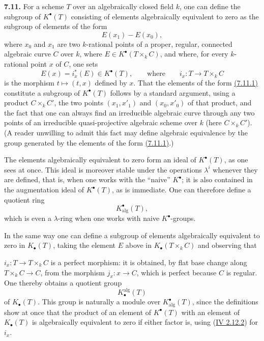\textbf{7.11.}
For a scheme $T$ over an algebraically closed field $k$, one can define the
subgroup of $K^\bullet(T)$ consisting of elements algebraically equivalent to
zero as the subgroup of elements of the form
\begin{equation}\tag{7.11.1}
E(x_1)-E(x_0),
\end{equation}
where $x_0$ and $x_1$ are two $k$-rational points of a proper, regular,
connected algebraic curve $C$ over $k$, where
$E\in K^\bullet(T\times_k C)$, and where, for every $k$-rational point $x$ of
$C$, one sets
\[
E(x)=i_x^*(E)\in K^\bullet(T),
\qquad\text{where}\qquad
i_x:T\longrightarrow T\times_k C
\]
is the morphism $t\mapsto(t,x)$ defined by $x$. That the elements of the form
\hyperlink{sga6.e10.eq.7-11-1}{(7.11.1)} constitute a subgroup of $K^\bullet(T)$ follows by a standard
argument, using a product $C\times_k C'$, the two points
$(x_1,x'_1)$ and $(x_0,x'_0)$ of that product, and the fact that one can
always find an irreducible algebraic curve through any two points of an
irreducible quasi-projective algebraic scheme over $k$ (here
$C\times_k C'$). (A reader
unwilling to admit this fact may define algebraic equivalence by the group
generated by the elements of the form \hyperlink{sga6.e10.eq.7-11-1}{(7.11.1)}.)

The elements algebraically equivalent to zero form an ideal of
$K^\bullet(T)$, as one sees at once. This ideal is moreover stable under the
operations $\lambda^i$ whenever they are defined, that is, when one works
with the ``naive'' $K^\bullet$; it is also contained in the augmentation
ideal of $K^\bullet(T)$, as is immediate. One can therefore define a quotient
ring
\begin{equation}\tag{7.11.2}
K^\bullet_{\mathrm{alg}}(T),
\end{equation}
which is even a $\lambda$-ring when one works with naive $K^\bullet$-groups.

In the same way one can define a subgroup of elements algebraically
equivalent to zero in $K_\bullet(T)$, taking the element $E$ above in
$K_\bullet(T\times_k C)$ and observing that

$i_x:T\to T\times_k C$ is a perfect morphism: it is obtained, by flat base
change along $T\times_k C\to C$, from the morphism $j_x:x\to C$, which is
perfect because $C$ is regular. One thereby obtains a quotient group
\begin{equation}\tag{7.11.3}
K_\bullet^{\mathrm{alg}}(T)
\end{equation}
of $K_\bullet(T)$. This group is naturally a module over
$K^\bullet_{\mathrm{alg}}(T)$, since the definitions show at once that the
product of an element of $K^\bullet(T)$ with an element of $K_\bullet(T)$ is
algebraically equivalent to zero if either factor is, using (\hyperlink{sga6.e04.eq.2-12-2}{IV 2.12.2}) for
$i_x$.

